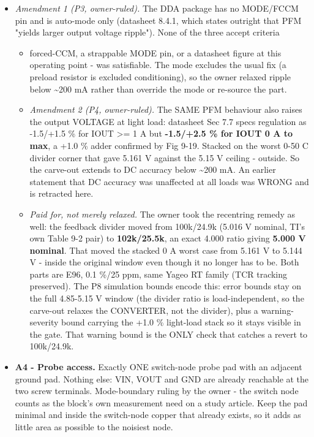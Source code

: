 \documentclass[11pt,a4paper]{article}
\begin{document}
\begin{itemize}
\item \emph{Amendment 1 (P3, owner-ruled).} The DDA package has no MODE/FCCM pin and
is auto-mode only (datasheet 8.4.1, which states outright that PFM
"yields larger output voltage ripple"). None of the three accept criteria
\begin{itemize}
\item forced-CCM, a strappable MODE pin, or a datasheet figure at this
operating point - was satisfiable. The mode excludes the usual fix (a
preload resistor is excluded conditioning), so the owner relaxed ripple
below \textasciitilde{}200 mA rather than override the mode or re-source the part.
\item \emph{Amendment 2 (P4, owner-ruled).} The SAME PFM behaviour also raises the
output VOLTAGE at light load: datasheet Sec 7.7 specs regulation as
-1.5/+1.5 \% for IOUT \textgreater{}= 1 A but \textbf{-1.5/+2.5 \% for IOUT 0 A to max}, a
+1.0 \% adder confirmed by Fig 9-19. Stacked on the worst 0-50 C divider
corner that gave 5.161 V against the 5.15 V ceiling - outside. So the
carve-out extends to DC accuracy below \textasciitilde{}200 mA. An earlier statement that
DC accuracy was unaffected at all loads was WRONG and is retracted here.
\item \emph{Paid for, not merely relaxed.} The owner took the recentring remedy as
well: the feedback divider moved from 100k/24.9k (5.016 V nominal, TI's
own Table 9-2 pair) to \textbf{102k/25.5k}, an exact 4.000 ratio giving
\textbf{5.000 V nominal}. That moved the stacked 0 A worst case from 5.161 V
to 5.144 V - inside the original window even though it no longer has to
be. Both parts are E96, 0.1 \%/25 ppm, same Yageo RT family (TCR tracking
preserved).
The P8 simulation bounds encode this: error bounds stay on the full
4.85-5.15 V window (the divider ratio is load-independent, so the carve-out
relaxes the CONVERTER, not the divider), plus a warning-severity bound
carrying the +1.0 \% light-load stack so it stays visible in the gate. That
warning bound is the ONLY check that catches a revert to 100k/24.9k.
\end{itemize}
\item \textbf{A4 - Probe access.} Exactly ONE switch-node probe pad with an adjacent
ground pad. Nothing else: VIN, VOUT and GND are already reachable at the
two screw terminals. Mode-boundary ruling by the owner - the switch node
counts as the block's own measurement need on a study article. Keep the
pad minimal and inside the switch-node copper that already exists, so it
adds as little area as possible to the noisiest node.
\end{itemize}
\end{document}
